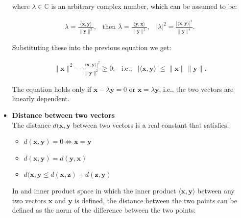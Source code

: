 \documentclass[10pt,b5paper,titlepage]{book}
\begin{document}
\begin{itemize}
        where $\lambda \in \mathbb{C}$ is an arbitrary complex number, which
        can be assumed to be:

        \begin{equation}
            \begin{array}{lcr}
                \lambda
                = \frac{\langle \mathbf{x}, \mathbf{y} \rangle}{\|\mathbf{y}\|^{2}},&
                \text{then } \overline{\lambda}
                = \frac{\langle \mathbf{y}, \mathbf{x} \rangle}{\|\mathbf{y}\|^{2}},&
                |\lambda|^{2}
                = \frac{|\langle \mathbf{x}, \mathbf{y} \rangle|^{2}}{\|\mathbf{y}\|^{4}}.
            \end{array}
        \end{equation}

        Substituting these into the previous equation we get:

        \begin{equation}
            \begin{array}{lcr}
                \|\mathbf{x}\|^{2}
                - \frac{|\langle \mathbf{x}, \mathbf{y} \rangle|^{2}}
                {\|\mathbf{y}\|^{2}} \ge 0;&
                \text{i.e.,}&
                |\langle \mathbf{x}, \mathbf{y} \rangle|
                \le \|\mathbf{x}\| \|\mathbf{y}\|.
            \end{array}
        \end{equation}

        The equation holds only if $\mathbf{x} - \lambda \mathbf{y} = 0$
        or $\mathbf{x} = \lambda \mathbf{y}$, i.e., the two vectors are
        linearly dependent.

    \item \textbf{Distance between two vectors}\\

        The distance $d(\mathbf{x}, \mathbf{y}$ between two vectors is
        a real constant that satisfies:

        \begin{itemize}
            \item $d(\mathbf{x}, \mathbf{y}) = 0 \iff \mathbf{x} = \mathbf{y}$
            \item $d(\mathbf{x}, \mathbf{y}) = d(\mathbf{y}, \mathbf{x})$
            \item $d(\mathbf{x}, \mathbf{y} \le  d(\mathbf{x}, \mathbf{z}) + d(\mathbf{z}, \mathbf{y})$
        \end{itemize}

        In and inner product space in which the inner product
        $\langle \mathbf{x}, \mathbf{y} \rangle$ between any two vectors
        $\mathbf{x}$ and $\mathbf{y}$ is defined, the distance between
        the two points can be defined as the norm of the difference
        between the two points:


\end{itemize}
\end{document}
